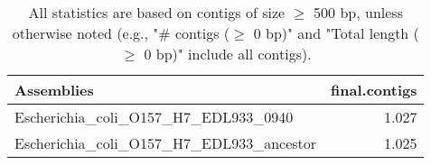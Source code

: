 \documentclass[12pt,a4paper]{article}
\begin{document}
\begin{table}[ht]
\begin{center}
\caption{All statistics are based on contigs of size $\geq$ 500 bp, unless otherwise noted (e.g., "\# contigs ($\geq$ 0 bp)" and "Total length ($\geq$ 0 bp)" include all contigs).}
\begin{tabular}{|l*{1}{|r}|}
\hline
Assemblies & final.contigs \\ \hline
Escherichia\_coli\_O157\_H7\_EDL933\_0940 & 1.027 \\ \hline
Escherichia\_coli\_O157\_H7\_EDL933\_ancestor & 1.025 \\ \hline
\end{tabular}
\end{center}
\end{table}
\end{document}
